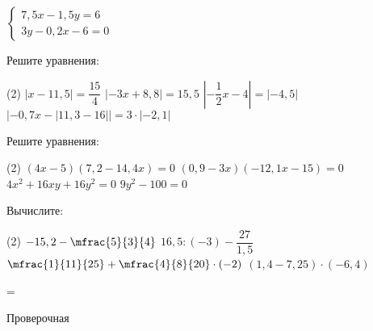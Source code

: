 \begin{class}[number=7]
\begin{listofex}
\begin{tasks}
			\task \( \begin{cases} 7,5x-1,5y=6 \\ 3y-0,2x-6=0 \end{cases} \)
		\end{tasks}
		\item Решите уравнения:
		\begin{tasks}(2)
			\task \( |x-11,5|=\dfrac{ 15 }{ 4 } \)
			\task \( |-3x+8,8|=15,5 \)
			\task \( \left| -\dfrac{ 1 }{ 2 }x-4 \right|=|-4,5| \)
			\task \( |-0,7x-|11,3-16||=3\cdot |-2,1| \)
		\end{tasks}
		\item Решите уравнения:
		\begin{tasks}(2)
			\task \( (4x-5)(7,2-14,4x)=0 \)
			\task \( (0,9-3x)(-12,1x-15)=0 \)
			\task \( 4x^2+16xy+16y^2=0 \)
			\task \( 9y^2-100=0 \)
		\end{tasks}
		\item Вычислите:
		\begin{tasks}(2)
			\task \( -15,2-\mfrac{5 }{3 }{4 } \)
			\task \( 16,5 : (-3) -\dfrac{ 27 }{ 1,5 } \)
			\task \( \mfrac{1 }{ 11}{25 } + \mfrac{4 }{8 }{20 } \cdot (-2) \)
			\task \( (1,4-7,25) \cdot (-6,4) \)
		\end{tasks}
	\end{listofex}
\end{class}

=%
\begin{exam}
	\begin{listofex}
		\item Проверочная
	\end{listofex}
\end{exam}
